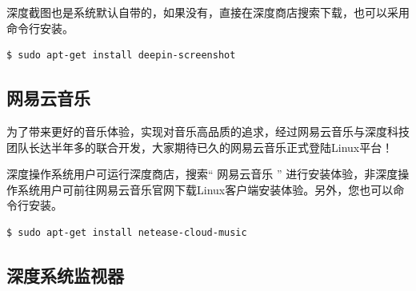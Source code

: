 \documentclass[doctor,openright,twoside]{sjtuthesis}
\theoremstyle{plain}
\theoremstyle{definition}
\theoremstyle{remark}
\theoremstyle{ocrenumbox}
\theoremstyle{plain}
\begin{document}
深度截图也是系统默认自带的，如果没有，直接在深度商店搜索下载，也可以采用命令行安装。

\begin{lstlisting}[language=bash]
$ sudo apt-get install deepin-screenshot
\end{lstlisting}

\hypertarget{section-31}{%
\subsection{网易云音乐}\label{section-31}}

为了带来更好的音乐体验，实现对音乐高品质的追求，经过网易云音乐与深度科技团队长达半年多的联合开发，大家期待已久的网易云音乐正式登陆Linux平台！


深度操作系统用户可运行深度商店，搜索`` 网易云音乐 '' 进行安装体验，非深度操作系统用户可前往网易云音乐官网下载Linux客户端安装体验。另外，您也可以命令行安装。

\begin{lstlisting}[language=bash]
$ sudo apt-get install netease-cloud-music
\end{lstlisting}

\hypertarget{section-32}{%
\subsection{深度系统监视器}\label{section-32}}
\end{document}
